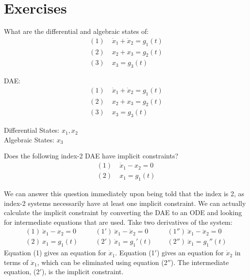 \section{Exercises}

\begin{exercise} %
    What are the differential and algebraic states of:
    \begin{align*}
        (1) &\; \dot{x}_1 + \dot{x}_2 = g_1(t)\\
        (2) &\; x_2 + x_3             = g_2(t)\\
        (3) &\; x_3                   = g_3(t)
    \end{align*}
\end{exercise}

\begin{solution}
    DAE:
    \begin{align*}
        (1) &\; \dot{x}_1 + \dot{x}_2 = g_1(t)\\
        (2) &\; x_2 + x_3             = g_2(t)\\
        (3) &\; x_3                   = g_3(t)
    \end{align*}
    
    Differential States: \(x_1, x_2\)\\
    Algebraic States: \(x_3\)
\end{solution}

\begin{exercise} %
    Does the following index-2 DAE have implicit constraints?
    \begin{align*}
        (1) &\; \dot{x}_1 - x_2 = 0\\
        (2) &\; x_1             = g_1(t)
    \end{align*}
\end{exercise}

\begin{solution}
    We can answer this question immediately upon being told that the index is 2, as index-2 systems necessarily have at least one implicit constraint. We can actually calculate the implicit constraint by converting the DAE to an ODE and looking for intermediate equations that are used. Take two derivatives of the system:
    \[
        \begin{array}{lll}
        (1)\ \dot{x}_1 - x_2 = 0 \qquad &
        (1')\ \ddot{x}_1 - \dot{x}_2 = 0 \qquad &
        (1'')\ \dddot{x}_1 - \ddot{x}_2 = 0\\[2pt]
        (2)\ x_1 = g_1(t) &
        (2')\ \dot{x}_1 = g_1'(t) &
        (2'')\ \ddot{x}_1 = g_1''(t)
        \end{array}
    \]
    Equation (1) gives an equation for $\dot{x}_1$. Equation (1$'$) gives an equation for $\dot{x}_2$ in terms of $\ddot{x}_1$, which can be eliminated  using equation (2$''$). The intermediate equation, (2$'$), is the implicit constraint.
\end{solution}


